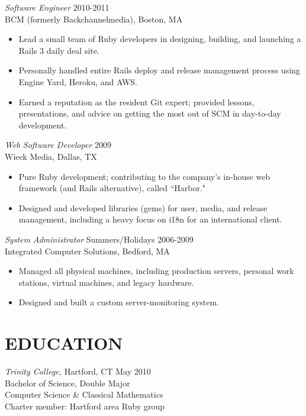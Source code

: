 \documentclass[line,margin]{res}
\begin{document}
\begin{resume}
  {\sl Software Engineer}  \hfill 2010-2011 \\
  BCM (formerly Backchannelmedia),
  Boston, MA
  \begin{itemize}  \itemsep -2pt %
    \item Lead a small team of Ruby developers in designing, building, and launching a Rails 3 daily deal site.
    \item Personally handled entire Rails deploy and release management process using Engine Yard, Heroku, and AWS.
    \item Earned a reputation as the resident Git expert; provided lessons, presentations, and advice on getting the most out of SCM in day-to-day development.
  \end{itemize}

  {\sl Web Software Developer}  \hfill 2009 \\
  Wieck Media,
  Dallas, TX
  \begin{itemize}  \itemsep -2pt %
    \item Pure Ruby development; contributing to the company's in-house web framework (and Rails alternative), called ``Harbor."
    \item Designed and developed libraries (gems) for user, media, and release management, including a heavy focus on i18n for an international client.
  \end{itemize}

  {\sl System Administrator}  \hfill Summers/Holidays 2006-2009 \\
  Integrated Computer Solutions,
  Bedford, MA
  \begin{itemize}  \itemsep -2pt %
       \item Managed all physical machines, including production servers, personal work stations, virtual machines, and legacy hardware.
       \item Designed and built a custom server-monitoring system.
  \end{itemize}

\section{EDUCATION}
  {\sl Trinity College,}
  Hartford, CT \hfill May 2010 \\
  Bachelor of Science, Double Major \\
  Computer Science \& Classical Mathematics \\
  Charter member: Hartford area Ruby group


\end{resume}
\end{document}
